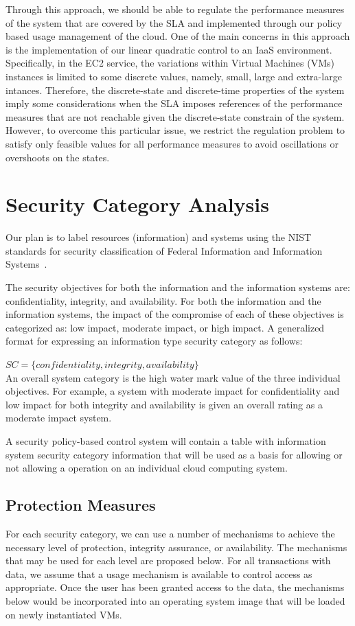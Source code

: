 \documentclass{sig-alternate}
\begin{document}
Through this approach, we should be able to regulate the performance measures of the system that are covered by the
SLA and implemented through our policy based usage management of the cloud. One of the main concerns in this approach is the
implementation of our linear quadratic control to an IaaS environment. 
Specifically, in the EC2 service, the variations within Virtual Machines (VMs) instances
is limited to some discrete values, namely, small, large and extra-large intances. Therefore, the discrete-state and
discrete-time properties of the system imply some considerations when the SLA imposes references of the 
performance measures that are not reachable given the discrete-state constrain of the system. However, to overcome 
this particular issue, we restrict the regulation problem to satisfy only feasible values for all performance measures to
avoid oscillations or overshoots on the states.

\section{Security Category Analysis}
Our plan is to label resources (information) and systems using the NIST standards for security classification of Federal Information and Information Systems~\cite{FIPS199}.

The security objectives for both the information and the information systems are: confidentiality, integrity, and availability.  For both the information and the information systems, the impact of the compromise of each of these objectives is categorized as: low impact, moderate impact, or high impact.  A generalized format for expressing an information type security category as follows:

\begin{math}
SC= \{confidentiality,integrity,availability\}
\end{math}
\\

An overall system category is the high water mark value of the three individual objectives.  For example, a system with moderate impact for confidentiality and low impact for both integrity and availability is given an overall rating as a moderate impact system.

A security policy-based control system will contain a table with information system security category information that will be used as a basis for allowing or not allowing a operation on an individual cloud computing system.

\subsection{Protection Measures}
For each security category, we can use a number of mechanisms to achieve the necessary level of protection, integrity assurance, or availability.  The mechanisms that may be used for each level are proposed below.  For all transactions with data, we assume that a usage mechanism is available to control access as appropriate.  Once the user has been granted access to the data, the mechanisms below would be incorporated into an operating system image that will be loaded on newly instantiated VMs.
\end{document}
